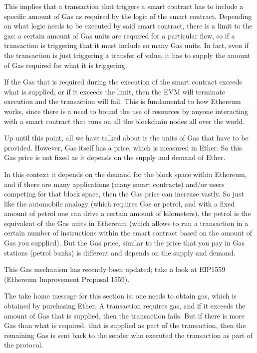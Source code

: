 This implies that a transaction that triggers a smart contract has to
include a specific amount of Gas as required by the logic of the smart
contract. Depending on what logic needs to be executed by said smart
contract, there is a limit to the gas: a certain amount of Gas units are
required for a particular flow, so if a transaction is triggering that
it must include so many Gas units. In fact, even if the transaction is
just triggering a transfer of value, it has to supply the amount of Gas
required for what it is triggering.

If the Gas that is required during the execution of the smart contract
exceeds what is supplied, or if it exceeds the limit, then the EVM will
terminate execution and the transaction will fail. This is fundamental
to how Ethereum works, since there is a need to bound the use of
resources by anyone interacting with a smart contract that runs on all
the blockchain nodes all over the world.

Up until this point, all we have talked about is the units of Gas that
have to be provided. However, Gas itself has a price, which is measured
in Ether. So this Gas price is not fixed as it depends on the supply and
demand of Ether.

In this context it depends on the demand for the block space within
Ethereum, and if there are many applications (many smart contracts)
and/or users competing for that block space, then the Gas price can
increase vastly. So just like the automobile analogy (which requires Gas
or petrol, and with a fixed amount of petrol one can drive a certain
amount of kilometers), the petrol is the equivalent of the Gas units in
Ethereum (which allows to run a transaction in a certain number of
instructions within the smart contract based on the amount of Gas you
supplied). But the Gas price, similar to the price that you pay in Gas
stations (petrol bunks) is different and depends on the supply and
demand.

This Gas mechanism has recently been updated; take a look at EIP1559
(Ethereum Improvement Proposal 1559).

The take home message for this section is: one needs to obtain gas,
which is obtained by purchasing Ether. A transaction requires gas, and
if it exceeds the amount of Gas that is supplied, then the transaction
fails. But if there is more Gas than what is required, that is supplied
as part of the transaction, then the remaining Gas is sent back to the
sender who executed the transaction as part of the protocol.

